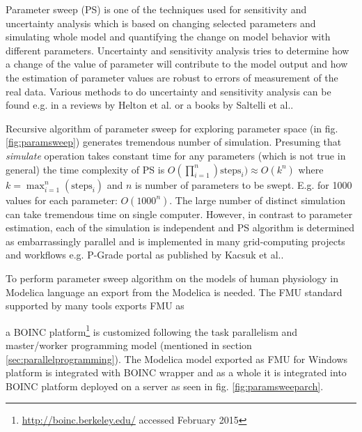 Parameter sweep (PS) is one of the techniques used for sensitivity and uncertainty analysis which is based on changing selected parameters and simulating whole model and quantifying the change on model behavior with different parameters. Uncertainty and sensitivity analysis tries to determine how a change of the value of parameter will contribute to the model output and how the estimation of parameter values are robust to errors of measurement of the real data. Various methods to do uncertainty and sensitivity analysis can be found e.g. in a reviews by Helton et al. \cite{Helton2006} or a books by Saltelli et al.\cite{Saltelli2004,Saltelli2008}. 

Recursive algorithm of parameter sweep for exploring parameter space (in fig.\ref{fig:paramsweep}) generates tremendous number of simulation. Presuming that \emph{simulate} operation takes constant time for any parameters (which is not true in general) the time complexity of PS is $O(\prod_{i=1}^{n}) \text{steps}_i) \approx  O(k^n)$ where $k=\max_{i=1}^n(\text{steps}_i)$ and $n$ is number of parameters to be swept. E.g. for 1000 values for each parameter: $O(1000^n)$. The large number of distinct simulation can take tremendous time on single computer. However, in contrast to parameter estimation, each of the simulation is independent and PS algorithm is determined as embarrassingly parallel and is implemented in many grid-computing projects and workflows e.g. P-Grade portal as published by Kacsuk et al.\cite{Kacsuk2011}.

To perform parameter sweep algorithm on the models of human physiology in Modelica language an export from the Modelica is needed. The FMU standard supported by many tools exports FMU as 

a BOINC platform\cite{Anderson2004}\footnote{\url{http://boinc.berkeley.edu/} accessed February 2015} is customized following the task parallelism and master/worker programming model (mentioned in section \ref{sec:parallelprogramming}). The Modelica model exported as FMU for Windows platform is integrated with BOINC wrapper and as a whole it is integrated into BOINC platform deployed on a server as seen in fig. \ref{fig:paramsweeparch}. 

